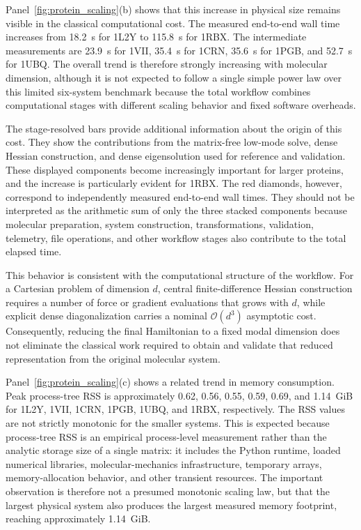 \documentclass[aip,jcp,reprint,amsmath,amssymb,floatfix]{revtex4-2}
\begin{document}
Panel~\ref{fig:protein_scaling}(b) shows that this increase in physical size
remains visible in the classical computational cost. The measured end-to-end
wall time increases from 18.2~s for 1L2Y to 115.8~s for 1RBX. The intermediate
measurements are 23.9~s for 1VII, 35.4~s for 1CRN, 35.6~s for 1PGB, and
52.7~s for 1UBQ. The overall trend is therefore strongly increasing with
molecular dimension, although it is not expected to follow a single simple
power law over this limited six-system benchmark because the total workflow
combines computational stages with different scaling behavior and fixed
software overheads.

The stage-resolved bars provide additional information about the origin of
this cost. They show the contributions from the matrix-free low-mode solve,
dense Hessian construction, and dense eigensolution used for reference and
validation. These displayed components become increasingly important for 
larger proteins, and the increase is particularly evident for 1RBX. The red
diamonds, however, correspond to independently measured end-to-end wall
times. They should not be interpreted as the arithmetic sum of only the three
stacked components because molecular preparation, system construction,
transformations, validation, telemetry, file operations, and other workflow
stages also contribute to the total elapsed time.

This behavior is consistent with the computational structure of the workflow.
For a Cartesian problem of dimension $d$, central finite-difference Hessian
construction requires a number of force or gradient evaluations that grows
with $d$, while explicit dense diagonalization carries a nominal
$\mathcal{O}(d^3)$ asymptotic cost. Consequently, reducing the final
Hamiltonian to a fixed modal dimension does not eliminate the classical work
required to obtain and validate that reduced representation from the original
molecular system.

Panel~\ref{fig:protein_scaling}(c) shows a related trend in memory consumption.
Peak process-tree RSS is approximately 0.62, 0.56, 0.55, 0.59, 0.69, and
1.14~GiB for 1L2Y, 1VII, 1CRN, 1PGB, 1UBQ, and 1RBX, respectively. The RSS
values are not strictly monotonic for the smaller systems. This is expected
because process-tree RSS is an empirical process-level measurement rather than
the analytic storage size of a single matrix: it includes the Python runtime,
loaded numerical libraries, molecular-mechanics infrastructure, temporary
arrays, memory-allocation behavior, and other transient resources. The
important observation is therefore not a presumed monotonic scaling law, but
that the largest physical system also produces the largest measured memory
footprint, reaching approximately 1.14~GiB.
\end{document}
